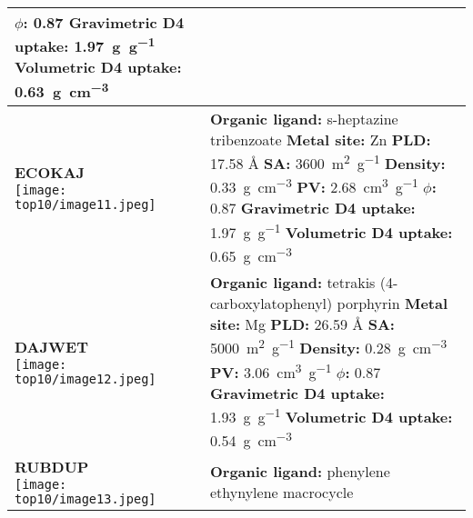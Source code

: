 {\begin{longtable}[]{@{}p{5cm}p{12cm}@{}}
{        \textbf{\(\phi\):} 0.87 \\
        \textbf{Gravimetric D4 uptake:} \SI{1.97}{\gram\per\gram} \\
        \textbf{Volumetric D4 uptake:} \SI{0.63}{\gram\per\centi\metre\cubed}}\\
    \midrule
    \makecell{\textbf{ECOKAJ} \\ \texttt{[image: top10/image11.jpeg]}}
    & \makecell[l]{
        \textbf{Organic ligand:} s-heptazine tribenzoate \\
        \textbf{Metal site:} Zn \\
        \textbf{PLD:} 17.58 Å \\
        \textbf{SA:} \SI{3600}{\metre\squared\per\gram} \\
        \textbf{Density:} \SI{0.33}{\gram\per\centi\metre\cubed} \\
        \textbf{PV:} \SI{2.68}{\centi\metre\cubed\per\gram} \\
        \textbf{\(\phi\):} 0.87 \\
        \textbf{Gravimetric D4 uptake:} \SI{1.97}{\gram\per\gram} \\
        \textbf{Volumetric D4 uptake:} \SI{0.65}{\gram\per\centi\metre\cubed}}\\
    \midrule
    \makecell{\textbf{DAJWET} \\ \texttt{[image: top10/image12.jpeg]}}
    & \makecell[l]{
        \textbf{Organic ligand:} tetrakis (4-carboxylatophenyl) porphyrin \\
        \textbf{Metal site:} Mg \\
        \textbf{PLD:} 26.59 Å \\
        \textbf{SA:} \SI{5000}{\metre\squared\per\gram} \\
        \textbf{Density:} \SI{0.28}{\gram\per\centi\metre\cubed} \\
        \textbf{PV:} \SI{3.06}{\centi\metre\cubed\per\gram} \\
        \textbf{\(\phi\):} 0.87 \\
        \textbf{Gravimetric D4 uptake:} \SI{1.93}{\gram\per\gram} \\
        \textbf{Volumetric D4 uptake:} \SI{0.54}{\gram\per\centi\metre\cubed}}\\
    \midrule
    \makecell{\textbf{RUBDUP} \\ \texttt{[image: top10/image13.jpeg]}}
    & \makecell[l]{
        \textbf{Organic ligand:} phenylene ethynylene macrocycle \\
}
\end{longtable}}
